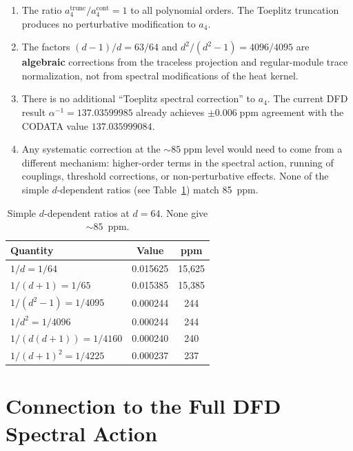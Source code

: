 \documentclass[12pt,a4paper]{article}
\begin{document}
\begin{tcolorbox}[title=Central Result]
\begin{enumerate}
\item The ratio $a_4^{\mathrm{trunc}}/a_4^{\mathrm{cont}} = 1$ to all
  polynomial orders.  The Toeplitz truncation produces no perturbative
  modification to $a_4$.

\item The factors $(d-1)/d = 63/64$ and $d^2/(d^2-1) = 4096/4095$ are
  \textbf{algebraic} corrections from the traceless projection and
  regular-module trace normalization, not from spectral modifications
  of the heat kernel.

\item There is no additional ``Toeplitz spectral correction'' to $a_4$.
  The current DFD result $\alpha^{-1} = 137.03599985$ already achieves
  $\pm 0.006\;\mathrm{ppm}$ agreement with the CODATA value
  $137.035999084$.

\item Any systematic correction at the $\sim 85\;\mathrm{ppm}$ level would
  need to come from a different mechanism: higher-order terms in the
  spectral action, running of couplings, threshold corrections, or
  non-perturbative effects.  None of the simple $d$-dependent ratios
  (see Table~\ref{tab:ppm}) match 85~ppm.
\end{enumerate}
\end{tcolorbox}

\begin{table}[h]
\centering
\begin{tabular}{lcc}
\toprule
Quantity & Value & ppm \\
\midrule
$1/d = 1/64$ & 0.015625 & 15,625 \\
$1/(d+1) = 1/65$ & 0.015385 & 15,385 \\
$1/(d^2-1) = 1/4095$ & 0.000244 & 244 \\
$1/d^2 = 1/4096$ & 0.000244 & 244 \\
$1/(d(d+1)) = 1/4160$ & 0.000240 & 240 \\
$1/(d+1)^2 = 1/4225$ & 0.000237 & 237 \\
\bottomrule
\end{tabular}
\caption{Simple $d$-dependent ratios at $d = 64$.  None give $\sim 85$~ppm.}
\label{tab:ppm}
\end{table}

\section{Connection to the Full DFD Spectral Action}
\label{sec:full-spectral-action}
\end{document}
